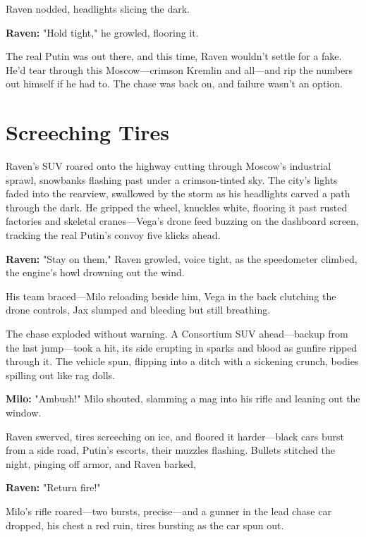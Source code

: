 \documentclass[12pt]{book}
\begin{document}
Raven nodded, headlights slicing the dark.

\vspace{0.5em}
\textbf{Raven:} "Hold tight," he growled, flooring it.

The real Putin was out there, and this time, Raven wouldn’t settle for a fake. He’d tear through this Moscow—crimson Kremlin and all—and rip the numbers out himself if he had to. The chase was back on, and failure wasn’t an option.

\vspace{1em}

\section{Screeching Tires}

Raven’s SUV roared onto the highway cutting through Moscow’s industrial sprawl, snowbanks flashing past under a crimson-tinted sky. The city’s lights faded into the rearview, swallowed by the storm as his headlights carved a path through the dark. He gripped the wheel, knuckles white, flooring it past rusted factories and skeletal cranes—Vega’s drone feed buzzing on the dashboard screen, tracking the real Putin’s convoy five klicks ahead.

\vspace{0.5em}
\textbf{Raven:} "Stay on them," Raven growled, voice tight, as the speedometer climbed, the engine’s howl drowning out the wind.

His team braced—Milo reloading beside him, Vega in the back clutching the drone controls, Jax slumped and bleeding but still breathing.

The chase exploded without warning. A Consortium SUV ahead—backup from the last jump—took a hit, its side erupting in sparks and blood as gunfire ripped through it. The vehicle spun, flipping into a ditch with a sickening crunch, bodies spilling out like rag dolls.

\vspace{0.5em}
\textbf{Milo:} "Ambush!" Milo shouted, slamming a mag into his rifle and leaning out the window.

Raven swerved, tires screeching on ice, and floored it harder—black cars burst from a side road, Putin’s escorts, their muzzles flashing. Bullets stitched the night, pinging off armor, and Raven barked,

\vspace{0.5em}
\textbf{Raven:} "Return fire!"

Milo’s rifle roared—two bursts, precise—and a gunner in the lead chase car dropped, his chest a red ruin, tires bursting as the car spun out.
\end{document}

